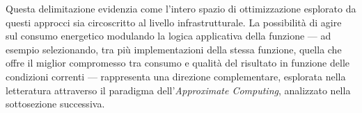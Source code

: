 Questa delimitazione evidenzia come l'intero spazio di ottimizzazione
esplorato da questi approcci sia circoscritto al livello
infrastrutturale. La possibilità di agire sul consumo energetico
modulando la logica applicativa della funzione --- ad esempio
selezionando, tra più implementazioni della stessa funzione, quella
che offre il miglior compromesso tra consumo e qualità del risultato
in funzione delle condizioni correnti --- rappresenta una direzione
complementare, esplorata nella letteratura attraverso il paradigma
dell'\emph{Approximate Computing}, analizzato nella sottosezione
successiva.